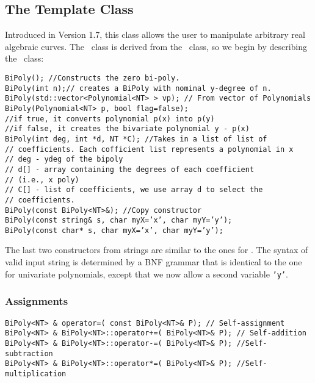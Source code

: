 \subsection{The Template Class \Curve}

Introduced in Version 1.7, this class allows the user 
to manipulate arbitrary real algebraic curves. 
The \Curve\ class is derived from the \BiPoly\ class,
so we begin by describing the \BiPoly\ class:

\begin{progb}{
\> \tt  BiPoly(); //Constructs the zero bi-poly.\\
\> \tt	BiPoly(int n);// creates a BiPoly with nominal y-degree of n.\\
\> \tt  BiPoly(std::vector<Polynomial<NT> > vp); // From vector of Polynomials\\
\> \tt  BiPoly(Polynomial<NT> p, bool flag=false);\\
\> \>  //if true, it converts polynomial p(x) into p(y)\\
\> \>  //if false, it creates the bivariate polynomial y - p(x)\\
\> \tt  BiPoly(int deg, int *d, NT *C);  //Takes in a list of list of\\
\> \>  // coefficients.	Each cofficient list represents a polynomial in x\\
\> \>  //  deg - ydeg of the bipoly\\
\> \>  //  d[] - array containing the degrees of each coefficient\\
\> \>  //          (i.e., x poly)\\
\> \>  //  C[] - list of coefficients, we use array d to select the \\
\> \>  //        coefficients.\\
\> \tt   BiPoly(const BiPoly<NT>\&); //Copy constructor\\
\> \tt   BiPoly(const string\& s, char myX='x', char myY='y');\\
\> \tt   BiPoly(const char* s, char myX='x', char myY='y');
}\end{progb}


The last two constructors from strings
are similar to the ones for \Poly.  The syntax of valid input string
is determined by a BNF grammar that is identical to the
one for univariate polynomials, except that we now
allow a second variable {\tt 'y'}.


\subsubsection{Assignments}
\begin{progb} {
\> \tt  BiPoly<NT> \& operator=( const BiPoly<NT>\& P); // Self-assignment\\
\> \tt  BiPoly<NT> \& BiPoly<NT>::operator+=( BiPoly<NT>\& P); // Self-addition\\
\> \tt  BiPoly<NT> \& BiPoly<NT>::operator-=( BiPoly<NT>\& P); //Self-subtraction\\
\> \tt BiPoly<NT> \& BiPoly<NT>::operator*=( BiPoly<NT>\& P); //Self-multiplication}\end{progb}

